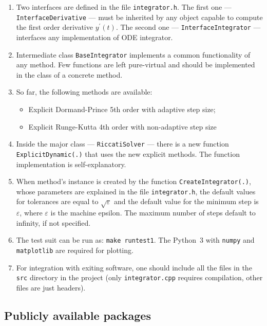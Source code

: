 \documentclass[]{article}
\begin{document}
\begin{enumerate}
\item Two interfaces are defined in the file \texttt{integrator.h}. The first one ---  \texttt{InterfaceDerivative} --- must be inherited by any object capable to compute the first order derivative $y^{\prime}(t)$. The second one --- \texttt{InterfaceIntegrator} --- interfaces any implementation of ODE integrator.
\item Intermediate class \texttt{BaseIntegrator} implements a common functionality of any method. Few functions are left pure-virtual and should be implemented in the class of a concrete method.
\item So far, the following methods are available:
\begin{itemize}
\item Explicit Dormand-Prince 5th order with adaptive step size;
\item Explicit Runge-Kutta 4th order with non-adaptive step size
\end{itemize}
\item Inside the major class --- \texttt{RiccatiSolver} --- there is a new function \texttt{ExplicitDynamic(.)} that uses the new explicit methods. The function implementation is self-explanatory.
\item When method's instance is created by the function \texttt{CreateIntegrator(.)}, whose parameters are explained in the file \texttt{integrator.h}, the default values for tolerances are equal to $\sqrt{\varepsilon}$ and the default value for the minimum step is $\varepsilon$, where $\varepsilon$ is the machine epsilon. The maximum number of steps default to infinity, if not specified.
\item The test suit can be run as: \texttt{make runtest1}. The Python~3 with \texttt{numpy} and \texttt{matplotlib} are required for plotting.
\item For integration with exiting software, one should include all the files in the \texttt{src} directory in the project (only \texttt{integrator.cpp} requires compilation, other files are just headers).
\end{enumerate}

\subsection{Publicly available packages}
\end{document}
